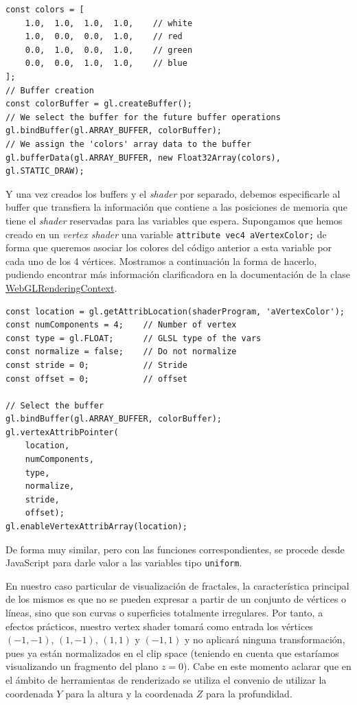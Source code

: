 \begin{lstlisting}
const colors = [
    1.0,  1.0,  1.0,  1.0,    // white
    1.0,  0.0,  0.0,  1.0,    // red
    0.0,  1.0,  0.0,  1.0,    // green
    0.0,  0.0,  1.0,  1.0,    // blue
];
// Buffer creation
const colorBuffer = gl.createBuffer();
// We select the buffer for the future buffer operations
gl.bindBuffer(gl.ARRAY_BUFFER, colorBuffer);
// We assign the 'colors' array data to the buffer
gl.bufferData(gl.ARRAY_BUFFER, new Float32Array(colors), gl.STATIC_DRAW);
\end{lstlisting}

Y una vez creados los buffers y el \textit{shader} por separado, debemos especificarle al buffer que transfiera la información que contiene a las posiciones de memoria que tiene el \textit{shader} reservadas para las variables que espera. Supongamos que hemos creado en un \textit{vertex shader} una variable \verb|attribute vec4 aVertexColor;| de forma que queremos asociar los colores del código anterior a esta variable por cada uno de los 4 vértices. Mostramos a continuación la forma de hacerlo, pudiendo encontrar más información clarificadora en la documentación de la clase \href{https://developer.mozilla.org/en-US/docs/Web/API/WebGLRenderingContext}{WebGLRenderingContext}.

\begin{lstlisting}
const location = gl.getAttribLocation(shaderProgram, 'aVertexColor');
const numComponents = 4;    // Number of vertex
const type = gl.FLOAT;      // GLSL type of the vars
const normalize = false;    // Do not normalize
const stride = 0;           // Stride
const offset = 0;           // offset

// Select the buffer
gl.bindBuffer(gl.ARRAY_BUFFER, colorBuffer);
gl.vertexAttribPointer(
    location,
    numComponents,
    type,
    normalize,
    stride,
    offset);
gl.enableVertexAttribArray(location);
\end{lstlisting}

De forma muy similar, pero con las funciones correspondientes, se procede desde JavaScript para darle valor a las variables tipo \verb|uniform|.

En nuestro caso particular de visualización de fractales, la característica principal de los mismos es que no se pueden expresar a partir de un conjunto de vértices o líneas, sino que son curvas o superficies totalmente irregulares. Por tanto, a efectos prácticos, nuestro vertex shader tomará como entrada los vértices $(-1,-1)$, $(1,-1)$, $(1,1)$ y $(-1,1)$ y no aplicará ninguna transformación, pues ya están normalizados en el clip space (teniendo en cuenta que estaríamos visualizando un fragmento del plano $z=0$). Cabe en este momento aclarar que en el ámbito de herramientas de renderizado se utiliza el convenio de utilizar la coordenada $Y$ para la altura y la coordenada $Z$ para la profundidad.


